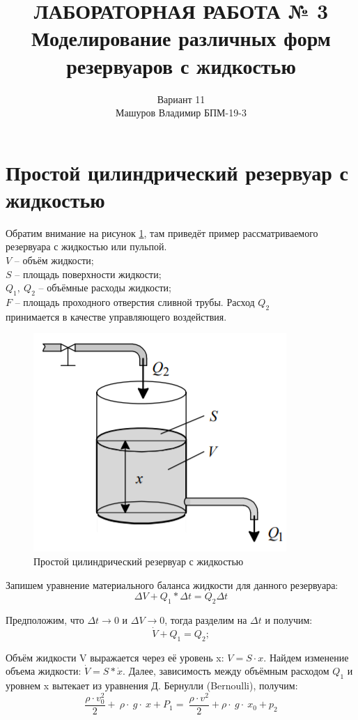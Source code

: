 \documentclass[a4paper, 12pt]{article}
\title{ЛАБОРАТОРНАЯ РАБОТА № 3 \\
Моделирование различных форм резервуаров с жидкостью
}
\author{Вариант 11 \\ Машуров Владимир БПМ-19-3}
\begin{document}
\maketitle
\thispagestyle{empty}
\newpage
\tableofcontents

\section{Простой цилиндрический резервуар с жидкостью}

Обратим внимание на рисунок \ref{p:Простой_цилиндрический_резервуар}, там приведёт пример рассматриваемого резервуара с жидкостью или пульпой. \\
$V$ – объём жидкости; \\
$S$ – площадь поверхности жидкости; \\
$Q_1,\ Q_2$  – объёмные расходы жидкости; \\ 
$F$ – площадь проходного отверстия сливной трубы. Расход $Q_2$ \\ принимается в качестве управляющего воздействия. \\


\begin{figure}[h!]
	\centering
	\includegraphics[scale=0.8]{example_1}
	\caption{Простой цилиндрический резервуар с жидкостью  }
	\label{p:Простой_цилиндрический_резервуар}
\end{figure}

Запишем уравнение материального баланса жидкости для данного резервуара:
$$ \Delta V + Q_1 * \Delta t = Q_2 \Delta t $$ 

Предположим, что $\Delta t \to 0$ и $\Delta V \to 0$, тогда разделим на $\Delta t$ и получим:
$$\dot{V}+Q_1=Q_2; $$

Объём жидкости V выражается через её уровень x: $V = S \cdot x $. Найдем изменение объема жидкости: $\dot{V}=S\ast\dot{x} $. Далее, зависимость между объёмным расходом $Q_1$ и уровнем x вытекает из
уравнения Д. Бернулли (Bernoulli), получим: 
$$\frac{\rho\cdot v_0^2}{2}+\ \rho\cdot\ g\cdot\ x+P_1=\ \frac{\rho\cdot v^2}{2} + \rho\cdot\ g\cdot\ x_0+p_2$$
\end{document}
